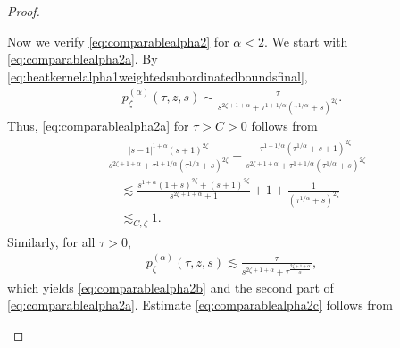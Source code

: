 \documentclass[12pt,reqno,a4paper]{amsart}
\theoremstyle{definition}
\theoremstyle{remark}
\numberwithin{equation}{section}
\newcommand{\1}{\mathbbm{1}}
\begin{document}
\begin{proof}
\begin{enumerate}
    Now we verify \eqref{eq:comparablealpha2} for $\alpha<2$. We start with \eqref{eq:comparablealpha2a}. By \eqref{eq:heatkernelalpha1weightedsubordinatedboundsfinal},
    \begin{align}
      p_\zeta^{(\alpha)}(\tau,z,s)
      \sim \frac{\tau}{s^{2\zeta+1+\alpha} + \tau^{1+1/\alpha}(\tau^{1/\alpha}+s)^{2\zeta}}.
    \end{align}
    Thus, \eqref{eq:comparablealpha2a} for $\tau>C>0$ follows from
    \begin{align}
      \label{eq:comparablealpha2aaux1}
      \begin{split}
        & \frac{|s-1|^{1+\alpha}(s+1)^{2\zeta}}{s^{2\zeta+1+\alpha} + \tau^{1+1/\alpha}(\tau^{1/\alpha}+s)^{2\zeta}}
        + \frac{\tau^{1+1/\alpha}(\tau^{1/\alpha}+s+1)^{2\zeta}}{s^{2\zeta+1+\alpha} + \tau^{1+1/\alpha}(\tau^{1/\alpha}+s)^{2\zeta}} \\
        & \quad \lesssim \frac{s^{1+\alpha}(1+s)^{2\zeta} + (s+1)^{2\zeta}}{s^{2\zeta+1+\alpha}+1} + 1 + \frac{1}{(\tau^{1/\alpha}+s)^{2\zeta}} \\
        & \quad \lesssim_{C,\zeta} 1.
      \end{split}
    \end{align}
    Similarly, for all $\tau>0$,
    \begin{align}
      p_\zeta^{(\alpha)}(\tau,z,s)
      \lesssim \frac{\tau}{s^{2\zeta+1+\alpha} + \tau^{\frac{2\zeta+1+\alpha}{\alpha}}},
    \end{align}
    which yields \eqref{eq:comparablealpha2b} and the second part of \eqref{eq:comparablealpha2a}. Estimate \eqref{eq:comparablealpha2c} follows from

\end{enumerate}
\end{proof}
\end{document}
